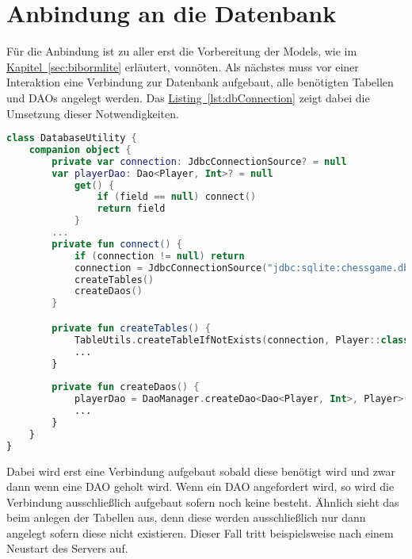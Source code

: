 \section{Anbindung an die Datenbank}
Für die Anbindung ist zu aller erst die Vorbereitung der Models, wie im \hyperref[sec:bibormlite]{Kapitel~\ref{sec:bibormlite}} erläutert, vonnöten.
Als nächstes muss vor einer Interaktion eine Verbindung zur Datenbank aufgebaut, alle benötigten Tabellen und \glspl{DAO} angelegt werden. Das \hyperref[lst:dbConnection]{Listing~\ref{lst:dbConnection}} zeigt dabei die Umsetzung  dieser Notwendigkeiten.
\begin{lstlisting}[style=lstStyleFramed, language=Kotlin, caption={Verbindungsaufbau \& Initialisierung der SQLite Datenbank}, label=lst:dbConnection, float]
class DatabaseUtility {
	companion object {
		private var connection: JdbcConnectionSource? = null
		var playerDao: Dao<Player, Int>? = null
			get() {
				if (field == null) connect()
				return field
			}
		...
		private fun connect() {
			if (connection != null) return
			connection = JdbcConnectionSource("jdbc:sqlite:chessgame.db")
			createTables()
			createDaos()
		}

		private fun createTables() {
			TableUtils.createTableIfNotExists(connection, Player::class.java)
			...
		}
		
		private fun createDaos() {
			playerDao = DaoManager.createDao<Dao<Player, Int>, Player>(connection, Player::class.java)
			...
		}
	}
}
\end{lstlisting}
Dabei wird erst eine Verbindung aufgebaut sobald diese benötigt wird und zwar dann wenn eine \gls{DAO} geholt wird. Wenn ein \gls{DAO} angefordert wird, so wird die Verbindung ausschließlich aufgebaut sofern noch keine besteht. Ähnlich sieht das beim anlegen der Tabellen aus, denn diese werden ausschließlich nur dann angelegt sofern diese nicht existieren. Dieser Fall tritt beispielsweise nach einem Neustart des Servers auf.

